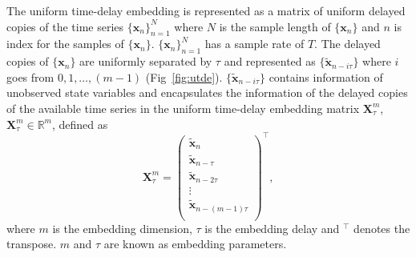 The uniform time-delay embedding is represented as a matrix of uniform delayed copies 
of the time series $\{ \boldsymbol{x}_n \}_{n=1}^N$ where $N$ is the sample length of
$\{ \boldsymbol{x}_n \}$ and $n$ is index for the samples of $\{ \boldsymbol{x}_n \}$.
$\{ \boldsymbol{x}_n \}_{n=1}^N$ has a sample rate of $T$.
The delayed copies of $\{ \boldsymbol{x}_n \}$ are uniformly separated by $\tau$
and represented as $\{\boldsymbol{ \tilde{x} }_{n- i\tau} \}$
where $i$ goes from $0,1, \dots, (m-1)$ (Fig~\ref{fig:utde}).
$\{\boldsymbol{ \tilde{x} }_{n- i\tau} \}$ contains
information of unobserved state variables and encapsulates the information of
the delayed copies of the available time series in the uniform time-delay embedding matrix 
$\boldsymbol{X}^{m}_{\tau}$, $\boldsymbol{X}^{m}_{\tau} \in \mathbb{R}^m$, defined as
\begin{equation}\label{eq:tde}
\boldsymbol{X}^{m}_{\tau}  =
\begin{pmatrix}
\boldsymbol{ \tilde{x} }_n \\
\boldsymbol{ \tilde{x} }_{n-\tau} \\
\boldsymbol{ \tilde{x} }_{n-2\tau} \\
\vdots \\
\boldsymbol{ \tilde{x} }_{n- (m-1) \tau} \\
\end{pmatrix}^\intercal, 
\end{equation}
where $m$ is the embedding dimension, $\tau$ is the embedding delay and
$ ^\intercal$ denotes the transpose.
$m$ and $\tau$ are known as embedding parameters.
